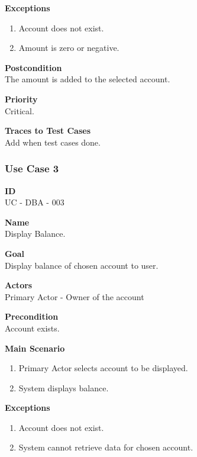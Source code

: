 \documentclass[12pt]{article}
\begin{document}
\noindent
    {\bf Exceptions}\\
    \vspace{-0.2in}
    \begin{enumerate}
    \item Account does not exist.
    \item Amount is zero or negative.
    \end{enumerate}

\noindent
{\bf Postcondition}\\
The amount is added to the selected account.

\noindent
{\bf Priority}\\
Critical.

\noindent
{\bf Traces to Test Cases}\\
Add when test cases done.

\subsubsection{Use Case 3} \label{uc:3}

\noindent
{\bf ID}\\
UC - DBA - 003    

\noindent
{\bf Name}\\
Display Balance.

\noindent
{\bf Goal}\\
Display balance of chosen account to user.

\noindent
{\bf Actors}\\
Primary Actor - Owner of the account

\noindent
{\bf Precondition}\\
Account exists.

\noindent
{\bf Main Scenario}\\
\vspace*{-0.2in}
\begin{enumerate}
\item Primary Actor selects account to be displayed.
\item System displays balance.
\end{enumerate}

\noindent
{\bf Exceptions}\\
\vspace*{-0.2in}
\begin{enumerate}
\item Account does not exist.
\item System cannot retrieve data for chosen account.
\end{enumerate}
\end{document}
